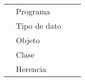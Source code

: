 \begin{table}[]
\begin{tabular}{|llll|}
                                                                            & Programa      & \multicolumn{1}{r}{}                                                                                                                                                                                  &                                                                                                                                                                                                                                                             \\
                                                                            & Tipo de dato  & \multicolumn{1}{r}{}                                                                                                                                                                                  &                                                                                                                                                                                                                                                             \\
                                                                            & Objeto        & \multicolumn{1}{r}{}                                                                                                                                                                                  &                                                                                                                                                                                                                                                             \\
                                                                            & Clase         & \multicolumn{1}{r}{}                                                                                                                                                                                  &                                                                                                                                                                                                                                                             \\
                                                                            & Herencia      &                                                                                                                                                                                                       &                                                                                                                                                                                                                                                             \\

\end{tabular}
\end{table}
